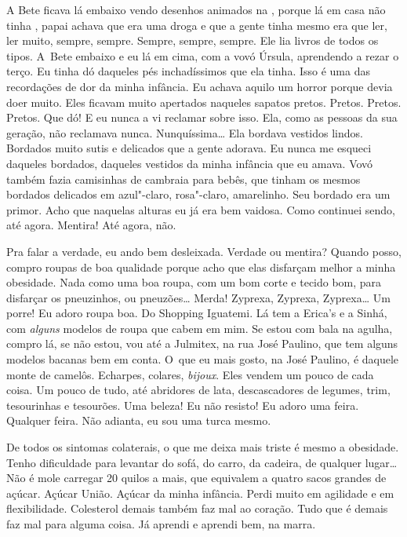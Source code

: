 A Bete ficava lá embaixo vendo desenhos animados na , porque lá em
casa não tinha , papai achava que  era uma droga e que a gente tinha
mesmo era que ler, ler muito, sempre, sempre. Sempre, sempre, sempre.
Ele lia livros de todos os tipos. A~Bete embaixo e eu lá em cima, com
a vovó Úrsula, aprendendo a rezar o terço. Eu tinha dó daqueles pés
inchadíssimos que ela tinha. Isso é uma das recordações de dor da minha
infância. Eu achava aquilo um horror porque devia doer muito. Eles
ficavam muito apertados naqueles sapatos pretos. Pretos. Pretos. Pretos.
Que dó! E eu nunca a vi reclamar sobre isso. Ela, como as pessoas da sua
geração, não reclamava nunca. Nunquíssima… Ela bordava vestidos
lindos. Bordados muito sutis e delicados que a gente adorava. Eu nunca
me esqueci daqueles bordados, daqueles vestidos da minha infância que eu
amava. Vovó também fazia camisinhas de cambraia para bebês, que tinham
os mesmos bordados delicados em azul"-claro, rosa"-claro, amarelinho. Seu
bordado era um primor. Acho que naquelas alturas eu já era bem vaidosa.
Como continuei sendo, até agora. Mentira! Até agora, não.

Pra falar a verdade, eu ando bem desleixada. Verdade ou mentira? Quando
posso, compro roupas de boa qualidade porque acho que elas disfarçam
melhor a minha obesidade. Nada como uma boa roupa, com um bom corte e
tecido bom, para disfarçar os pneuzinhos, ou pneuzões… Merda!
Zyprexa, Zyprexa, Zyprexa… Um porre! Eu adoro roupa boa. Do
Shopping Iguatemi. Lá tem a Erica's e a Sinhá, com \emph{alguns} modelos
de roupa que cabem em mim. Se estou com bala na agulha, compro lá, se
não estou, vou até a Julmitex, na rua José Paulino, que tem alguns
modelos bacanas bem em conta. O~que eu mais gosto, na José Paulino, é
daquele monte de camelôs. Echarpes, colares, \emph{bijoux}. Eles vendem
um pouco de cada coisa. Um pouco de tudo, até abridores de lata,
descascadores de legumes, trim, tesourinhas e tesourões. Uma beleza! Eu
não resisto! Eu adoro uma feira. Qualquer feira. Não adianta, eu sou uma
turca mesmo.

De todos os sintomas colaterais, o que me deixa mais triste é mesmo a
obesidade. Tenho dificuldade para levantar do sofá, do carro, da
cadeira, de qualquer lugar… Não é mole carregar 20 quilos a mais,
que equivalem a quatro sacos grandes de açúcar. Açúcar União. Açúcar da
minha infância. Perdi muito em agilidade e em flexibilidade. Colesterol
demais também faz mal ao coração. Tudo que é demais faz mal para alguma
coisa. Já aprendi e aprendi bem, na marra.

